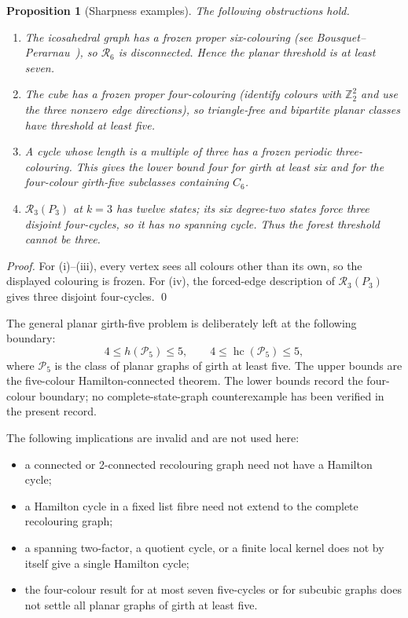\documentclass[11pt]{article}
\newtheorem{proposition}[theorem]{Proposition}
\theoremstyle{remark}
\newcommand{\R}{\mathcal R}
\newcommand{\hc}{\operatorname{hc}}
\numberwithin{equation}{section}
\numberwithin{table}{section}
\begin{document}
\begin{proposition}[Sharpness examples]
\label{prop:sharpness}
The following obstructions hold.
\begin{enumerate}[label=(\roman*)]
\item The icosahedral graph has a frozen proper six-colouring (see Bousquet--Perarnau~\cite{BP16}), so $\R_6$ is disconnected.  Hence the planar threshold is at least seven.
\item The cube has a frozen proper four-colouring (identify colours with $\mathbb Z_2^2$ and use the three nonzero edge directions), so triangle-free and bipartite planar classes have threshold at least five.
\item A cycle whose length is a multiple of three has a frozen periodic three-colouring.  This gives the lower bound four for girth at least six and for the four-colour girth-five subclasses containing $C_6$.
\item $\R_3(P_3)$ at $k=3$ has twelve states; its six degree-two states force three disjoint four-cycles, so it has no spanning cycle.  Thus the forest threshold cannot be three.
\end{enumerate}
\end{proposition}

\begin{proof}
For (i)--(iii), every vertex sees all colours other than its own, so the displayed colouring is frozen.  For (iv), the forced-edge description of $\R_3(P_3)$ gives three disjoint four-cycles. \qed
\end{proof}

The general planar girth-five problem is deliberately left at the following boundary:
\[
 4\le h(\mathcal P_5)\le5,\qquad
 4\le\hc(\mathcal P_5)\le5,
\]
where $\mathcal P_5$ is the class of planar graphs of girth at least five.  The upper bounds are the five-colour Hamilton-connected theorem.  The lower bounds record the four-colour boundary; no complete-state-graph counterexample has been verified in the present record.

The following implications are invalid and are not used here:
\begin{itemize}
\item a connected or 2-connected recolouring graph need not have a Hamilton cycle;
\item a Hamilton cycle in a fixed list fibre need not extend to the complete recolouring graph;
\item a spanning two-factor, a quotient cycle, or a finite local kernel does not by itself give a single Hamilton cycle;
\item the four-colour result for at most seven five-cycles or for subcubic graphs does not settle all planar graphs of girth at least five.
\end{itemize}
\end{document}
